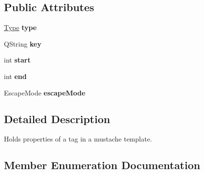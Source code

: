 \subsection*{Public Attributes}
\begin{DoxyCompactItemize}
\item 
\hypertarget{structMustache_1_1Tag_ad58b3b921b7e84c31efd88864c2040d4}{}\hyperlink{structMustache_1_1Tag_ab702ed1288811f8bb16d76babfdb6472}{Type} {\bfseries type}\label{structMustache_1_1Tag_ad58b3b921b7e84c31efd88864c2040d4}

\item 
\hypertarget{structMustache_1_1Tag_a25f46abd595426bc00230f69215db567}{}Q\+String {\bfseries key}\label{structMustache_1_1Tag_a25f46abd595426bc00230f69215db567}

\item 
\hypertarget{structMustache_1_1Tag_a4f967c59794b9dd5d711fa7a1d5aff43}{}int {\bfseries start}\label{structMustache_1_1Tag_a4f967c59794b9dd5d711fa7a1d5aff43}

\item 
\hypertarget{structMustache_1_1Tag_a9fc4a5ccee302e0bd9833ec2dd30bc3d}{}int {\bfseries end}\label{structMustache_1_1Tag_a9fc4a5ccee302e0bd9833ec2dd30bc3d}

\item 
\hypertarget{structMustache_1_1Tag_a2ce4c079ced32e8e4cadeca893a886a2}{}Escape\+Mode {\bfseries escape\+Mode}\label{structMustache_1_1Tag_a2ce4c079ced32e8e4cadeca893a886a2}

\end{DoxyCompactItemize}


\subsection{Detailed Description}
Holds properties of a tag in a mustache template. 

\subsection{Member Enumeration Documentation}
\hypertarget{structMustache_1_1Tag_ab702ed1288811f8bb16d76babfdb6472}{}
